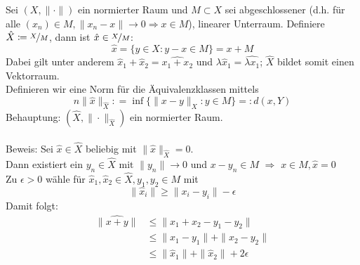 \begin{definition} \label{def:2.15-Quotientenraeume}
	Sei $(X, \| \cdot \|)$ ein normierter Raum und $M \subset X$ sei abgeschlossener (d.h. für alle $(x_{n}) \in M, \| x_{n} - x \| \rightarrow 0 \Rightarrow x \in M$), linearer Unterraum.
	Definiere $\hat X \coloneqq \nicefrac{X}{M}$, dann ist $\hat x \in \nicefrac{X}{M}$:
		\[ \hat x = \{ y \in X: y - x \in M \} = x + M \]
	Dabei gilt unter anderem $\hat x_{1} + \hat x_{2} = \widehat{x_{1} + x_{2}}$ und $\lambda \hat x_{1} = \widehat{\lambda x_{1}}$; $\hat X$ bildet somit einen Vektorraum. \\
	Definieren wir eine Norm für die Äquivalenzklassen mittels
		\[n\| \hat x \|_{\hat X} : = \inf \{ \| x - y \|_{X}: y \in M \} =: d(x, Y) \]
	Behauptung: $(\hat X, \| \cdot \|_{\hat X})$ ein normierter Raum. \\ \\
	Beweis: Sei $\hat x \in \hat X$ beliebig mit $\| \hat x \|_{\hat X} = 0$. \\
	Dann existiert ein $y_{n} \in \hat X \text{ mit } \| y_{n} \| \rightarrow 0$ und $x - y_{n} \in M$ $\Rightarrow$ $x \in M, \hat x = 0 $ \\
	Zu $\epsilon > 0$ wähle für $\hat x_{1}, \hat x_{2} \in \hat X, y_{1}, y_{2} \in M$ mit
	\[ \| \hat x_{i} \| \geq \| x_{i} - y_{i} \| - \epsilon \] 
	Damit folgt:
	\begin{align*}
		\| \widehat{x + y} \| & \leq \| x_{1} + x_{2} - y_{1} - y_{2} \| \\
						  & \leq \| x_{1} - y_{1} \| + \| x_{2} - y_{2} \| \\
						  & \leq \| \hat x_{1} \| + \| \hat x_{2} \| + 2 \epsilon
	\end{align*}
\end{definition}


